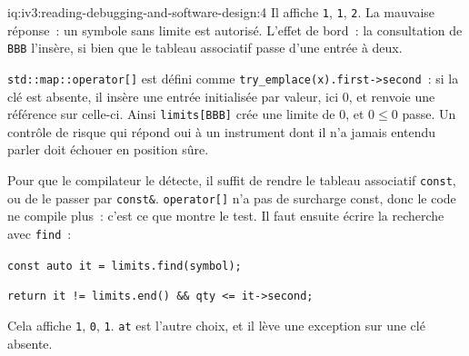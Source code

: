\begin{solution}{iq:iv3:reading-debugging-and-software-design:4}
Il affiche \texttt{1}, \texttt{1}, \texttt{2}. La mauvaise réponse~: un symbole sans limite est autorisé. L'effet de bord~: la consultation de \texttt{BBB} l'insère, si bien que le tableau associatif passe d'une entrée à deux.

\texttt{std::map::operator[]} est défini comme \texttt{try\_emplace(x).first->second}~: si la clé est absente, il insère une entrée initialisée par valeur, ici 0, et renvoie une référence sur celle-ci. Ainsi \texttt{limits[\textquotedbl{}BBB\textquotedbl{}]} crée une limite de 0, et $0 \le 0$ passe. Un contrôle de risque qui répond oui à un instrument dont il n'a jamais entendu parler doit échouer en position sûre.

Pour que le compilateur le détecte, il suffit de rendre le tableau associatif \texttt{const}, ou de le passer par \texttt{const\&}. \texttt{operator[]} n'a pas de surcharge const, donc le code ne compile plus~: c'est ce que montre le test. Il faut ensuite écrire la recherche avec \texttt{find}~:

\texttt{const auto it = limits.find(symbol);}

\texttt{return it != limits.end() \&\& qty <= it->second;}

Cela affiche \texttt{1}, \texttt{0}, \texttt{1}. \texttt{at} est l'autre choix, et il lève une exception sur une clé absente.


\end{solution}

